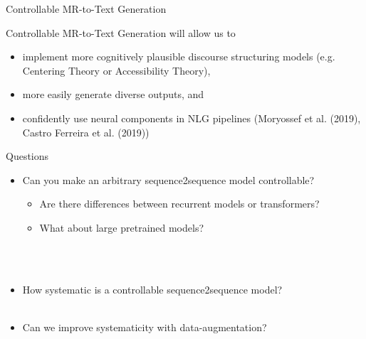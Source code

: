 \begin{frame}{Controllable MR-to-Text Generation}


    Controllable MR-to-Text Generation will allow us to 
    \begin{itemize}
        \item implement more cognitively plausible
            discourse structuring models (e.g. Centering Theory or Accessibility Theory), 
\item more easily generate diverse outputs, and
\item confidently use neural components in NLG pipelines (Moryossef et al. (2019), Castro Ferreira et al. (2019))
    \end{itemize}
    


\end{frame}


\begin{frame}{Questions}
\begin{itemize}
\item Can you make an arbitrary sequence2sequence model controllable?
    \begin{itemize}
\item Are there differences between recurrent models or
transformers?
\item What about large pretrained models?
    \end{itemize} ~\\~\\
\item How systematic is a controllable sequence2sequence model? \\~\\
\item Can we improve systematicity with data-augmentation?~\\~\\
\end{itemize}
\end{frame}
